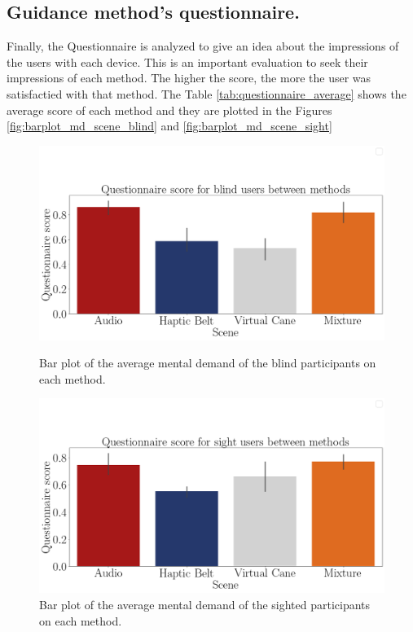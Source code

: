 \subsection{Guidance method's questionnaire.}
\label{subsec:results_questionnaires}

Finally, the Questionnaire is analyzed to give an idea about the impressions of the users with each device. This is an important evaluation to seek their impressions of each method. The higher the score, the more the user was satisfactied with that method. The Table \ref{tab:questionnaire_average} shows the average score of each method and they are plotted in the Figures \ref{fig:barplot_md_scene_blind} and \ref{fig:barplot_md_scene_sight}



\begin{figure}[!htb]
    \centering
    \begin{minipage}{\textwidth}
        \centering
        \includegraphics[width = 0.8\linewidth]{Resultados/Questionario/Figuras/png/barplot_questionnaire_scene_blind.png}
        \caption{Bar plot of the average mental demand of the blind participants on each method.}
        \label{fig:barplot_questionnaire_scene_blind}
    \end{minipage}
    \begin{minipage}{\textwidth}
        \centering
        \includegraphics[width = 0.8\linewidth]{Resultados/Questionario/Figuras/png/barplot_questionnaire_scene_sight.png}
        \caption{Bar plot of the average mental demand of the sighted participants on each method.}
        \label{fig:barplot_questionnaire_scene_sight}
    \end{minipage}
\end{figure}

